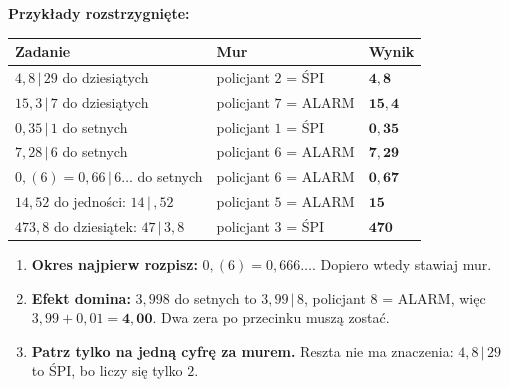 \documentclass[11pt,a4paper]{article}
\begin{document}
\vspace{0.2em}
\textbf{Przykłady rozstrzygnięte:}
\begin{center}
\renewcommand{\arraystretch}{1.4}
\begin{tabular}{@{}lll@{}}
\toprule
Zadanie & Mur & Wynik \\
\midrule
$4{,}8\,|\,29$ do dziesiątych & policjant $2$ = ŚPI & $\mathbf{4{,}8}$ \\
$15{,}3\,|\,7$ do dziesiątych & policjant $7$ = ALARM & $\mathbf{15{,}4}$ \\
$0{,}35\,|\,1$ do setnych & policjant $1$ = ŚPI & $\mathbf{0{,}35}$ \\
$7{,}28\,|\,6$ do setnych & policjant $6$ = ALARM & $\mathbf{7{,}29}$ \\
$0{,}(6)=0{,}66\,|\,6\ldots$ do setnych & policjant $6$ = ALARM & $\mathbf{0{,}67}$ \\
$14{,}52$ do jedności: $14\,|\,{,}52$ & policjant $5$ = ALARM & $\mathbf{15}$ \\
$473{,}8$ do dziesiątek: $47\,|\,3{,}8$ & policjant $3$ = ŚPI & $\mathbf{470}$ \\
\bottomrule
\end{tabular}
\end{center}

\begin{pulapka}
\begin{enumerate}[leftmargin=*, itemsep=2pt]
  \item \textbf{Okres najpierw rozpisz:} $0{,}(6)=0{,}666\ldots$. Dopiero wtedy stawiaj mur.
  \item \textbf{Efekt domina:} $3{,}998$ do setnych to $3{,}99\,|\,8$, policjant $8$ = ALARM, więc $3{,}99+0{,}01=\mathbf{4{,}00}$. Dwa zera po przecinku muszą zostać.
  \item \textbf{Patrz tylko na jedną cyfrę za murem.} Reszta nie ma znaczenia: $4{,}8\,|\,29$ to ŚPI, bo liczy się tylko $2$.
\end{enumerate}
\end{pulapka}
\end{document}
